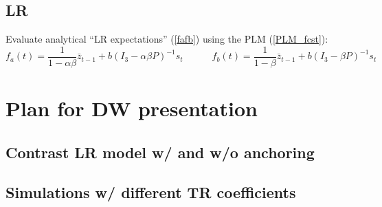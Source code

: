 \documentclass[11pt]{article}
\def \myFigPath {../figures/}
\renewcommand{\[}{\begin{equation}}
\renewcommand{\]}{\end{equation}}
\def\myBiggerFigScale{0.4}
\def\myFigScale{0.3}
\begin{document}
\subsection{LR}
Evaluate analytical ``LR expectations'' (\ref{fafb}) using the PLM (\ref{PLM_fcst}):
\begin{equation}
f_a(t) = \frac{1}{1-\alpha\beta}\bar{z}_{t-1}  + b(I_3 - \alpha\beta P)^{-1}s_t \quad \quad \quad f_b(t) = \frac{1}{1-\beta}\bar{z}_{t-1}  + b(I_3 - \beta P)^{-1}s_t  \label{fafb_analytical}
\end{equation}


\section{Plan for DW presentation}
\subsection{Contrast LR model w/ and w/o anchoring}
\subsection{Simulations w/ different TR coefficients}

%
\end{document}
